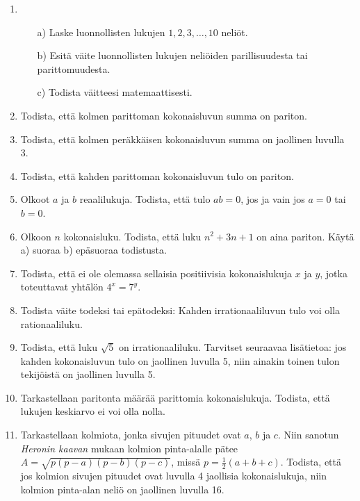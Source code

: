 \begin{enumerate}

\item
\begin{itemize}
\item[a)] Laske luonnollisten lukujen $1, 2, 3,\ldots,
10$ neliöt.
\item[b)] Esitä väite luonnollisten lukujen neliöiden
parillisuudesta tai parittomuudesta.
\item[c)] Todista väitteesi matemaattisesti.
\end{itemize}

\item Todista, että kolmen parittoman kokonaisluvun summa on pariton.

\item Todista, että kolmen peräkkäisen kokonaisluvun summa
on jaollinen luvulla 3.

\item Todista, että kahden parittoman kokonaisluvun tulo
on pariton.

\item Olkoot $a$ ja $b$ reaalilukuja. Todista, että tulo $ab = 0$, jos ja vain jos $a=0$ tai $b=0$.

\item Olkoon $n$ kokonaisluku. Todista, että luku $n^{2} + 3n + 1$ on aina pariton. Käytä a) suoraa b) epäsuoraa
todistusta.

\item Todista, että ei ole olemassa sellaisia
positiivisia kokonaislukuja $x$ ja $y$, jotka toteuttavat
yhtälön $4^{x} = 7^{y}$.

\item Todista väite todeksi tai epätodeksi: Kahden
irrationaaliluvun tulo voi olla rationaaliluku.

\item Todista, että luku $\sqrt{5}$ on irrationaaliluku.
Tarvitset seuraavaa lisätietoa: jos kahden kokonaisluvun
tulo on jaollinen luvulla 5, niin ainakin toinen tulon
tekijöistä on jaollinen luvulla 5.

\item Tarkastellaan paritonta määrää parittomia
kokonaislukuja. Todista, että lukujen keskiarvo ei voi
olla nolla.

\item Tarkastellaan kolmiota, jonka sivujen pituudet ovat
$a$, $b$ ja $c$. Niin sanotun {\em Heronin kaavan} mukaan
kolmion pinta-alalle pätee $A = \sqrt{p(p-a)(p-b)(p-c)}$,
missä $p = \frac{1}{2}(a+b+c)$. Todista, että jos kolmion
sivujen pituudet ovat luvulla 4 jaollisia kokonaislukuja,
niin kolmion pinta-alan neliö on jaollinen luvulla 16.


\end{enumerate}
